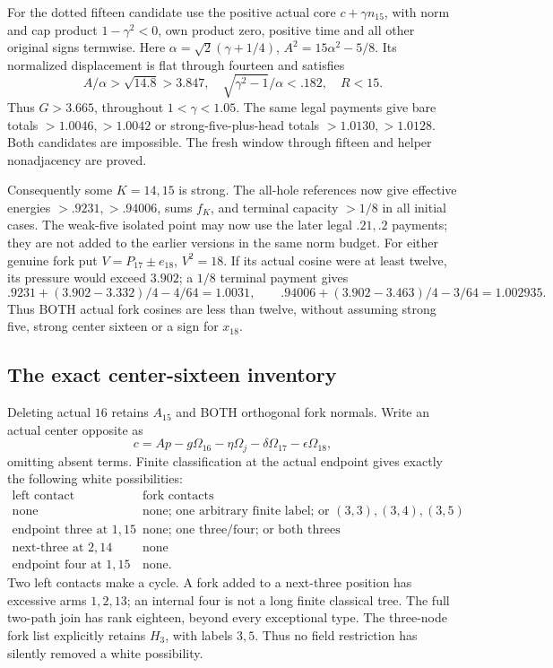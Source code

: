 For the dotted fifteen candidate use the positive actual core
\(c+\gamma n_{15}\), with norm and cap product \(1-\gamma^2<0\),
own product zero, positive time and all other original signs termwise.
Here \(\alpha=\sqrt2(\gamma+1/4)\), \(A^2=15\alpha^2-5/8\).
Its normalized displacement is flat through fourteen and satisfies
\[
 A/\alpha>\sqrt{14.8}>3.847,\quad
 \sqrt{\gamma^2-1}/\alpha<.182,\quad R<15 .
\]
Thus \(G>3.665\), throughout \(1<\gamma<1.05\).
The same legal payments give bare totals \(>1.0046,>1.0042\)
or strong-five-plus-head totals \(>1.0130,>1.0128\).
Both candidates are impossible.
The fresh window through fifteen and helper nonadjacency are proved.

Consequently some \(K=14,15\) is strong.
The all-hole references now give effective energies
\(>.9231,>.94006\), sums \(f_K\), and terminal capacity \(>1/8\)
in all initial cases. The weak-five isolated point may now use
the later legal \(.21,.2\) payments; they are not added to the
earlier versions in the same norm budget.
For either genuine fork put \(V=P_{17}\pm e_{18}\), \(V^2=18\).
If its actual cosine were at least twelve, its pressure would exceed
\(3.902\); a \(1/8\) terminal payment gives
\[
 .9231+(3.902-3.332)/4-4/64=1.0031,\qquad
 .94006+(3.902-3.463)/4-3/64=1.002935.
\]
Thus BOTH actual fork cosines are less than twelve, without assuming
strong five, strong center sixteen or a sign for \(x_{18}\).

\subsection{The exact center-sixteen inventory}
\label{app:D18centerinventory}
Deleting actual \(16\) retains \(A_{15}\) and BOTH orthogonal
fork normals. Write an actual center opposite as
\[
 c=Ap-g\Omega_{16}-\eta\Omega_j-\delta\Omega_{17}
      -\epsilon\Omega_{18},
\]
omitting absent terms. Finite classification at the actual endpoint gives
exactly the following white possibilities:
\[
\begin{array}{c|c}
 \text{left contact}&\text{fork contacts}\\ \hline
 \text{none}&\text{none; one arbitrary finite label; or }(3,3),(3,4),(3,5)\\
 \text{endpoint three at }1,15&
 \text{none; one three/four; or both threes}\\
 \text{next-three at }2,14&\text{none}\\
 \text{endpoint four at }1,15&\text{none}.
\end{array}
\]
Two left contacts make a cycle. A fork added to a next-three
position has excessive arms \(1,2,13\); an internal four is not a
long finite classical tree. The full two-path join has rank eighteen,
beyond every exceptional type. The three-node fork list explicitly
retains \(H_3\), with labels \(3,5\). Thus no field restriction has
silently removed a white possibility.

